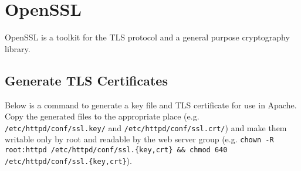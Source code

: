 \section{OpenSSL}

OpenSSL is a toolkit for the TLS protocol and a general purpose cryptography library.

\subsection{Generate TLS Certificates}

Below is a command to generate a key file and TLS certificate for use in Apache. Copy the generated files to the appropriate place (e.g. \lstinline|/etc/httpd/conf/ssl.key/| and \lstinline|/etc/httpd/conf/ssl.crt/|) and make them writable only by root and readable by the web server group (e.g. \lstinline|chown -R root:httpd /etc/httpd/conf/ssl.{key,crt} && chmod 640 /etc/httpd/conf/ssl.{key,crt}|).

